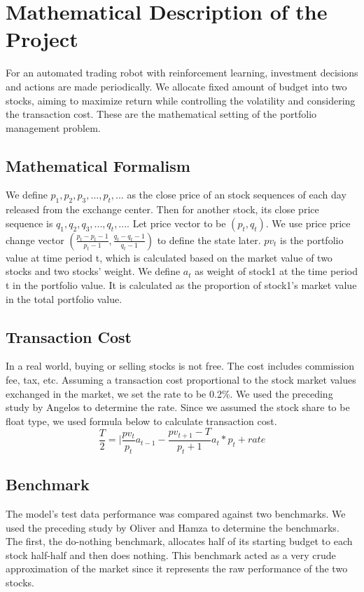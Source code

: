\chapter{Mathematical Description of the Project}
\label{Ch:mathematical description}
For an automated trading robot with reinforcement learning, investment decisions and actions are made periodically. We allocate fixed amount of budget into two stocks, aiming to maximize return while controlling the volatility and considering the transaction cost. These are the mathematical setting of the portfolio management problem.

\section{Mathematical Formalism}
We define $p_1,p_2,p_3,...,p_t,...$ as the close price of an stock sequences of each day released from the exchange center. Then for another stock, its close price sequence is $q_1,q_2,q_3,...,q_t,...$. Let price vector to be $(p_t, q_t)$. We use price price change vector $(\frac{p_t-p_t-1}{p_t-1},\frac{q_t-q_t-1}{q_t-1})$ to define the state later.
$pv_t$ is the portfolio value at time period t, which is calculated based on the market value of two stocks and two stocks' weight. We define $a_t$ as weight of stock1 at the time period t in the portfolio value. It is calculated as the proportion of stock1's market value in the total portfolio value.


\section{Transaction Cost}
In a real world, buying or selling stocks is not free. The cost includes commission fee, tax, etc. Assuming a transaction cost proportional to the stock market values exchanged in the market, we set the rate to be 0.2\%. We used the preceding study by Angelos to determine the rate. Since we assumed the stock share to be float type, we used formula below to calculate transaction cost. 
$$\frac{T}{2} = |\frac{pv_t}{p_t}a_{t-1} - \frac{pv_{t+1}-T}{p_t+1}a_t*p_t+rate$$


\section{Benchmark}
The model’s test data performance was compared against two benchmarks. We used the preceding study by Oliver and Hamza to determine the benchmarks. The first, the do-nothing benchmark, allocates half of its starting budget to each stock half-half and then does nothing. This benchmark acted as a very crude approximation of the market since it represents the raw performance of the two stocks.

